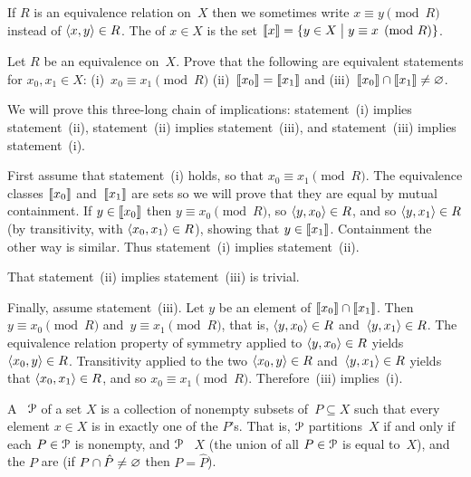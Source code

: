 \documentclass{ibl}  %
\begin{document}
\begin{df}
If $R$ is an equivalence relation on~$X$ then 
we sometimes write $x\equiv y\pmod R$ instead of $\langle x,y\rangle\in R$.
The  of $x\in X$ is the set
$\llbracket x \rrbracket=\{y\in X \bigm| y\equiv x\pmod R\}$.   
\end{df}

\begin{problem} Let $R$ be an equivalence on~$X$.
Prove that the following are equivalent statements for $x_0,x_1\in X$:
(i)~$x_0\equiv x_1\pmod R$
(ii)~$\llbracket x_0 \rrbracket=\llbracket x_1 \rrbracket$    
and (iii)~$\llbracket x_0 \rrbracket\cap\llbracket x_1 \rrbracket\neq \varnothing$.
\begin{answer}
We will prove this three-long chain of implications: 
statement~(i) implies statement~(ii),
statement~(ii) implies statement~(iii),
and
statement~(iii) implies statement~(i).

First assume that statement~(i) holds, so that $x_0\equiv x_1\pmod R$.
The equivalence classes $\llbracket x_0 \rrbracket$ and~$\llbracket x_1 \rrbracket$ are sets so
we will prove that they are equal by mutual containment.
If $y\in\llbracket x_0 \rrbracket$ then $y\equiv x_0 \pmod R$,
so $\langle y,x_0\rangle\in R$, and so $\langle y,x_1\rangle\in R$
(by transitivity, with $\langle x_0,x_1\rangle\in R$),
showing that $y\in\llbracket x_1 \rrbracket$.
Containment the other way is similar.
Thus statement~(i) implies statement~(ii).

That statement~(ii) implies statement~(iii) is trivial.

Finally, assume statement~(iii).
Let $y$ be an element of $\llbracket x_0 \rrbracket\cap\llbracket x_1 \rrbracket$.
Then $y\equiv x_0\pmod R$ and~$y\equiv x_1\pmod R$,
that is, $\langle y,x_0\rangle\in R$ and~$\langle y,x_1\rangle\in R$.
The equivalence relation property of 
symmetry applied to $\langle y,x_0\rangle\in R$ yields~$\langle x_0,y\rangle\in R$.
Transitivity applied to the 
two $\langle x_0,y\rangle\in R$ and~$\langle y,x_1\rangle\in R$ yields
that $\langle x_0,x_1\rangle\in R$, and so $x_0\equiv x_1\pmod R$.
Therefore~(iii) implies~(i).
\end{answer}
\end{problem}

\begin{df}
A ~$\EuScript{P}$ of a set $X$ is a 
collection of nonempty subsets of~$P\subseteq X$ such that every 
element $x\in X$ is in exactly one of the $P$'s.
That is, $\EuScript{P}$ partitions~$X$ if and only if each
$P\in\EuScript{P}$ is nonempty,
and $\EuScript{P}$ ~$X$
(the union of all $P\in\EuScript{P}$ is equal to~$X$),
and the $P$ are 
(if $P\cap \hat{P}\neq\varnothing$ then $P=\hat{P}$).
\end{df}
\end{document}
